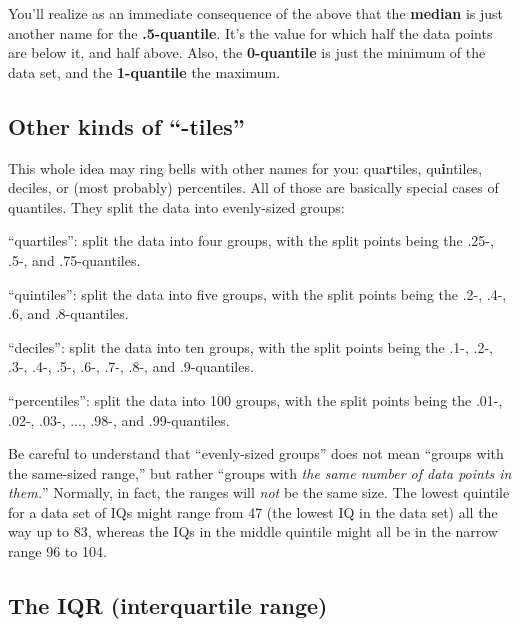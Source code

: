 
You'll realize as an immediate consequence of the above that the
\textbf{median} is just another name for the \textbf{.5-quantile}. It's the
value for which half the data points are below it, and half above. Also, the
\textbf{0-quantile} is just the minimum of the data set, and the
\textbf{1-quantile} the maximum.

\subsection{Other kinds of ``-tiles''}

This whole idea may ring bells with other names for you: qua\textbf{r}tiles,
qu\textbf{i}ntiles, deciles, or (most probably) percentiles. All of those are
basically special cases of quantiles. They split the data into evenly-sized
groups:


\begin{compactitem}
\item ``quartiles'': split the data into four groups, with the split points
being the .25-, .5-, and .75-quantiles.
\item ``quintiles'': split the data into five groups, with the split points
being the .2-, .4-, .6, and .8-quantiles.
\item ``deciles'': split the data into ten groups, with the split points
being the .1-, .2-, .3-, .4-, .5-, .6-, .7-, .8-, and .9-quantiles.
\item ``percentiles'': split the data into 100 groups, with the split points
being the .01-, .02-, .03-, ..., .98-, and .99-quantiles.
\end{compactitem}

Be careful to understand that ``evenly-sized groups'' does not mean ``groups
with the same-sized range,'' but rather ``groups with \textit{the same number
of data points in them.}'' Normally, in fact, the ranges will \textit{not} be
the same size. The lowest quintile for a data set of IQs might range from 47
(the lowest IQ in the data set) all the way up to 83, whereas the IQs in the
middle quintile might all be in the narrow range 96 to 104.

\subsection{The IQR (interquartile range)}

